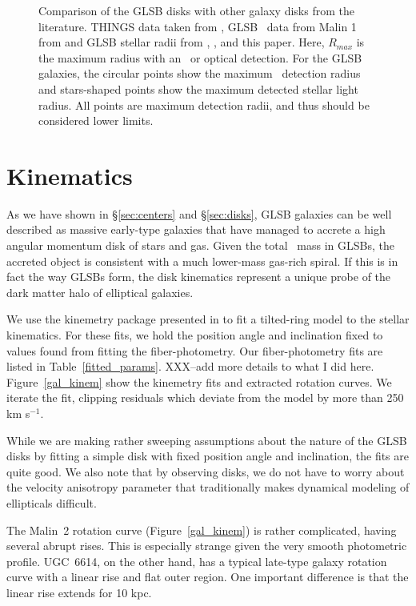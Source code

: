 \documentclass[12pt,preprint]{aastex}
\newcommand\kms{km s$^{-1}$}
\newcommand\HI{\ion{H}{1}}
\begin{document}
\begin{figure*}
\caption{ Comparison of the GLSB disks with other galaxy disks from the literature.
THINGS data taken from \citet{DeBlok2008}, GLSB \HI\ data from Malin 1 from \citet{Pickering97} and GLSB stellar radii from \citet{Galaz15}, \citet{Kasparova14}, and this paper.
Here, $R_{max}$ is the maximum radius with an \HI\ or optical detection.
For the GLSB galaxies, the circular points show the maximum \HI\ detection radius and stars-shaped points show the maximum detected stellar light radius.
All points are maximum detection radii, and thus should be considered lower limits.
 \label{disk_comp}}
\end{figure*}


\section{Kinematics}\label{sec:kinematics}

As we have shown in \S\ref{sec:centers} and \S\ref{sec:disks}, GLSB galaxies can be well described as massive early-type galaxies that have managed to accrete a high angular momentum disk of stars and gas.
Given the total \HI\ mass in GLSBs, the accreted object is consistent with a much lower-mass gas-rich spiral.
If this is in fact the way GLSBs form, the disk kinematics represent a unique probe of the dark matter halo of elliptical galaxies.

We use the kinemetry package presented in \citet{Krajn06} to fit a tilted-ring model to the stellar kinematics.
For these fits, we hold the position angle and inclination fixed to values found from fitting the fiber-photometry.
Our fiber-photometry fits are listed in Table~\ref{fitted_params}. XXX--add more details to what I did here.
Figure~\ref{gal_kinem} show the kinemetry fits and extracted rotation curves.
We iterate the fit, clipping residuals which deviate from the model by more than 250 \kms.


While we are making rather sweeping assumptions about the nature of the GLSB disks by fitting a simple disk with fixed position angle and inclination, the fits are quite good.
We also note that by observing disks, we do not have to worry about the velocity anisotropy parameter that traditionally makes dynamical modeling of ellipticals difficult.

The Malin~2 rotation curve (Figure~\ref{gal_kinem}) is rather complicated, having several abrupt rises.
This is especially strange given the very smooth photometric profile.
UGC~6614, on the other hand, has a typical late-type galaxy rotation curve with a linear rise and flat outer region.
One important difference is that the linear rise extends for 10 kpc.
\end{document}
